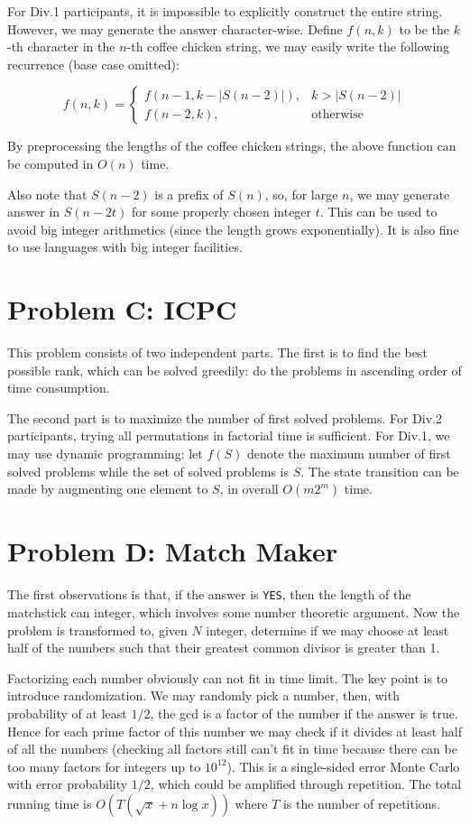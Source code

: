 \documentclass[a4paper,10.5pt,twoside]{article}
\begin{document}
For Div.1 participants, it is impossible to explicitly construct the entire string. However, we may generate the answer character-wise. Define $f(n, k)$ to be the $k$-th character in the $n$-th coffee chicken string, we may easily write the following recurrence (base case omitted):

$$
f(n, k) = \begin{cases}
	f(n-1, k-|S(n-2)|), & k > |S(n-2)| \\
	f(n-2, k), & \text{otherwise}
\end{cases}
$$

By preprocessing the lengths of the coffee chicken strings, the above function can be computed in $O(n)$ time.

Also note that $S(n-2)$ is a prefix of $S(n)$, so, for large $n$, we may generate answer in $S(n-2t)$ for some properly chosen integer $t$. This can be used to avoid big integer arithmetics (since the length grows exponentially). It is also fine to use languages with big integer facilities.

\section*{Problem C: ICPC}

This problem consists of two independent parts. The first is to find the best possible rank, which can be solved greedily: do the problems in ascending order of time consumption.

The second part is to maximize the number of first solved problems. For Div.2 participants, trying all permutations in factorial time is sufficient. For Div.1, we may use dynamic programming: let $f(S)$ denote the maximum number of first solved problems while the set of solved problems is $S$. The state transition can be made by augmenting one element to $S$, in overall $O(m 2^m)$ time.

\section*{Problem D: Match Maker}

The first observations is that, if the answer is \texttt{YES}, then the length of the matchstick can integer, which involves some number theoretic argument. Now the problem is transformed to, given $N$ integer, determine if we may choose at least half of the numbers such that their greatest common divisor is greater than 1.

Factorizing each number obviously can not fit in time limit. The key point is to introduce randomization. We may randomly pick a number, then, with probability of at least $1/2$, the gcd is a factor of the number if the answer is true. Hence  for each prime factor of this number we may check if it divides at least half of all the numbers (checking all factors still can't fit in time because there can be too many factors for integers up to $10^{12}$). This is a single-sided error Monte Carlo with error probability $1/2$, which could be amplified through repetition. The total running time is $O(T(\sqrt{x} + n \log x))$ where $T$ is the number of repetitions.
\end{document}
